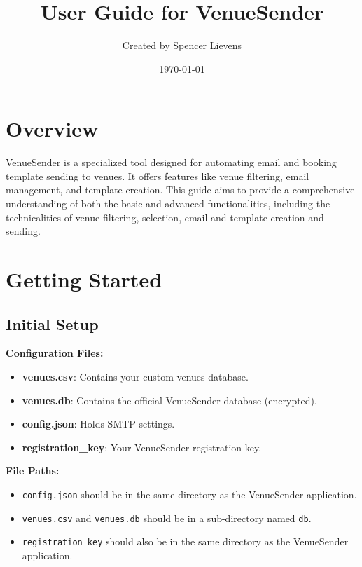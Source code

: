 \documentclass{article}
\title{\color{textcolor}User Guide for VenueSender}
\author{Created by Spencer Lievens}
\date{\today}
\begin{document}
	
	\maketitle
	\tableofcontents

	\section{Overview}
	
	VenueSender is a specialized tool designed for automating email and booking template sending to venues. It offers features like venue filtering, email management, and template creation. This guide aims to provide a comprehensive understanding of both the basic and advanced functionalities, including the technicalities of venue filtering, selection, email and template creation and sending.
	
	\section{Getting Started}
	
	\subsection{Initial Setup}
	
	\textbf{Configuration Files:}
	
	\begin{itemize}
		\item \textbf{venues.csv}: Contains your custom venues database.
		\item \textbf{venues.db}: Contains the official VenueSender database (encrypted).
		\item \textbf{config.json}: Holds SMTP settings.
		\item \textbf{registration\_key}: Your VenueSender registration key.
	\end{itemize}
	
	\textbf{File Paths:}
	
	\begin{itemize}
		\item \texttt{config.json} should be in the same directory as the VenueSender application.
		\item \texttt{venues.csv} and \texttt{venues.db} should be in a sub-directory named \texttt{db}.
		\item \texttt{registration\_key} should also be in the same directory as the VenueSender application.
	\end{itemize}
	
\end{document}
